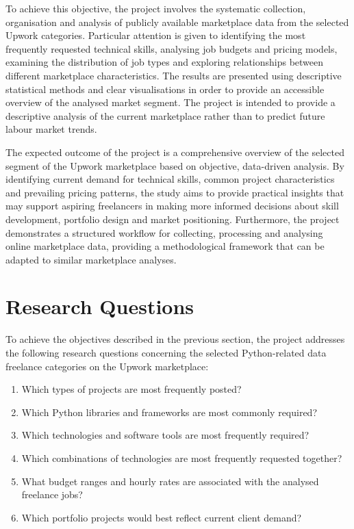     To achieve this objective, the project involves the systematic collection, organisation and analysis of publicly available marketplace
    data from the selected Upwork categories. Particular attention is given to identifying the most frequently requested technical skills,
    analysing job budgets and pricing models, examining the distribution of job types and exploring relationships between different
    marketplace characteristics. The results are presented using descriptive statistical methods and clear visualisations in order to provide
    an accessible overview of the analysed market segment. The project is intended to provide a descriptive analysis of the current marketplace
    rather than to predict future labour market trends.

    The expected outcome of the project is a comprehensive overview of the selected segment of the Upwork marketplace based on objective,
    data-driven analysis. By identifying current demand for technical skills, common project characteristics and prevailing pricing patterns,
    the study aims to provide practical insights that may support aspiring freelancers in making more informed decisions about skill development,
    portfolio design and market positioning. Furthermore, the project demonstrates a structured workflow for collecting, processing and
    analysing online marketplace data, providing a methodological framework that can be adapted to similar marketplace analyses.

    \section{Research Questions}

    To achieve the objectives described in the previous section, the project addresses the following research questions concerning the
    selected Python-related data freelance categories on the Upwork marketplace:

    \begin{enumerate}
        \item Which types of projects are most frequently posted?
        \item Which Python libraries and frameworks are most commonly required?
        \item Which technologies and software tools are most frequently required?
        \item Which combinations of technologies are most frequently requested together?
        \item What budget ranges and hourly rates are associated with the analysed freelance jobs?
        \item Which portfolio projects would best reflect current client demand?
    \end{enumerate}

